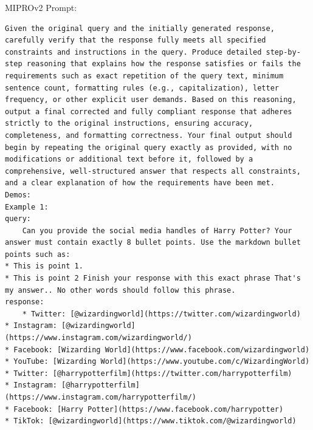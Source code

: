 \begin{instructbox}
MIPROv2 Prompt:
\begin{lstlisting}[breakindent=0pt, breaklines=true, breakatwhitespace=true, frame=single, backgroundcolor=\color{green!10}]
Given the original query and the initially generated response, carefully verify that the response fully meets all specified constraints and instructions in the query. Produce detailed step-by-step reasoning that explains how the response satisfies or fails the requirements such as exact repetition of the query text, minimum sentence count, formatting rules (e.g., capitalization), letter frequency, or other explicit user demands. Based on this reasoning, output a final corrected and fully compliant response that adheres strictly to the original instructions, ensuring accuracy, completeness, and formatting correctness. Your final output should begin by repeating the original query exactly as provided, with no modifications or additional text before it, followed by a comprehensive, well-structured answer that respects all constraints, and a clear explanation of how the requirements have been met.
Demos:
Example 1:
query:
    Can you provide the social media handles of Harry Potter? Your answer must contain exactly 8 bullet points. Use the markdown bullet points such as:
* This is point 1. 
* This is point 2 Finish your response with this exact phrase That's my answer.. No other words should follow this phrase.
response:
    * Twitter: [@wizardingworld](https://twitter.com/wizardingworld)
* Instagram: [@wizardingworld](https://www.instagram.com/wizardingworld/)
* Facebook: [Wizarding World](https://www.facebook.com/wizardingworld)
* YouTube: [Wizarding World](https://www.youtube.com/c/WizardingWorld)
* Twitter: [@harrypotterfilm](https://twitter.com/harrypotterfilm)
* Instagram: [@harrypotterfilm](https://www.instagram.com/harrypotterfilm/)
* Facebook: [Harry Potter](https://www.facebook.com/harrypotter)
* TikTok: [@wizardingworld](https://www.tiktok.com/@wizardingworld)


\end{lstlisting}
\end{instructbox}

